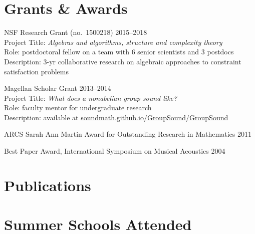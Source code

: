 \documentclass[margin,line]{resume}
\begin{document}
\begin{resume}
    \section{\mysidestyle Grants \& Awards}

    NSF Research Grant {\small (no.~1500218)} \hfill 2015--2018\\
    Project Title: \textsl{Algebras and algorithms, structure and complexity theory}\\ 
    Role: postdoctoral fellow on a team with 6 senior scientists and 3 postdocs\\
    Description: 3-yr collaborative research on algebraic approaches to constraint satisfaction problems

    \vspace{-1mm}
    Magellan Scholar Grant \hfill     2013--2014\\
    Project Title: \textsl{What does a nonabelian group sound like?}\\
    Role: faculty mentor for undergraduate research\\
    Description: available at {\small \href{http://soundmath.github.io/GroupSound/}{soundmath.github.io/GroupSound/GroupSound}}

    \vspace{-2mm}
    ARCS Sarah Ann Martin Award for Outstanding Research in Mathematics \hfill 2011

    \vspace{-2mm}
    Best Paper Award, International Symposium on Musical Acoustics \hfill  2004 

    \section{\mysidestyle Publications}

    
    
    \section{\mysidestyle Summer Schools Attended}


\end{resume}
\end{document}
